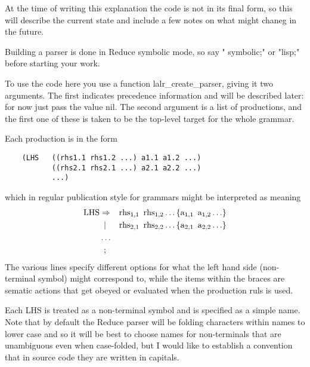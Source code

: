 \documentclass[12pt]{article}
\begin{document}
At the time of writing this explanation the code is not in its final form,
so this will describe the current state and include a few notes on what
might chaneg in the future.

Building a parser is done in Reduce symbolic mode, so say "{\ttfamily
symbolic;}" or "{\ttfamily lisp;}" before starting your work.

To use the code here you use a function {\ttfamily lalr\_create\_parser},
giving it two arguments. The first indicates precedence information and
will be described later: for now just pass the value {\ttfamily nil}.
The second argument is a list of productions, and the first one of these
is taken to be the top-level target for the whole grammar.

Each production is in the form
\begin{verbatim}
    (LHS   ((rhs1.1 rhs1.2 ...) a1.1 a1.2 ...)
           ((rhs2.1 rhs2.1 ...) a2.1 a2.2 ...)
           ...)
\end{verbatim}
\noindent which in regular publication style for grammars might be interpreted
as meaning
\begin{align*}
\text{LHS} & \Rightarrow & \text{rhs}_{1,1} \hspace{0.5em} \text{rhs}_{1,2} \ldots  & \left\{ \text{a}_{1,1} \hspace{0.5em} \text{a}_{1,2} \ldots \right\} \\
    & \hspace{0.5em}| & \text{rhs}_{2,1} \hspace{0.5em} \text{rhs}_{2,2} \ldots & \left\{ \text{a}_{2,1} \hspace{0.5em} \text{a}_{2,2} \ldots \right\} \\
    & \ldots  \\
    & \hspace{0.5em};
\end{align*}
The various lines specify different options for what the left hand side
(non-terminal symbol) might correspond to, while the items within the
braces are sematic actions that get obeyed or evaluated when the
production ruls is used.

Each LHS is treated as a non-terminal symbol and is specified as a simple
name. Note that by default the Reduce parser will be folding characters
within names to lower case and so it will be best to choose names for
non-terminals that are unambiguous even when case-folded, but I would like
to establish a convention that in source code they are written in capitals.
\end{document}
